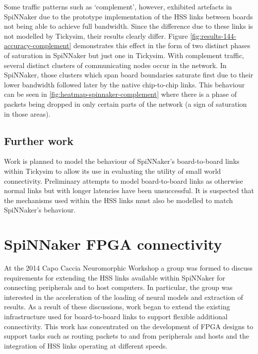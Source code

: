 			Some traffic patterns such as `complement', however, exhibited artefacts
			in SpiNNaker due to the prototype implementation of the HSS links between
			boards not being able to achieve full bandwidth. Since the difference due
			to these links is not modelled by Tickysim, their results clearly differ.
			Figure \ref{fig:results-144-accuracy-complement} demonstrates this effect
			in the form of two distinct phases of saturation in SpiNNaker but just one
			in Tickysim. With complement traffic, several distinct clusters of
			communicating nodes occur in the network. In SpiNNaker, those clusters
			which span board boundaries saturate first due to their lower bandwidth
			followed later by the native chip-to-chip links. This behaviour can be
			seen in \ref{fig:heatmap-spinnaker-complement} where there is a phase of
			packets being dropped in only certain parts of the network (a sign of
			saturation in those areas).
		
		\subsection{Further work}
			
			
			Work is planned to model the behaviour of SpiNNaker's board-to-board links
			within Tickysim to allow its use in evaluating the utility of small world
			connectivity. Preliminary attempts to model board-to-board links as
			otherwise normal links but with longer latencies have been unsuccessful.
			It is suspected that the mechanisms used within the HSS links must also be
			modelled to match SpiNNaker's behaviour.
	
	
	\section{SpiNNaker FPGA connectivity}
		
		
		At the 2014 Capo Caccia Neuromorphic Workshop a group was formed to discuss
		requirements for extending the HSS links available within SpiNNaker for
		connecting peripherals and to host computers. In particular, the group was
		interested in the acceleration of the loading of neural models and
		extraction of results.  As a result of these discussions, work began to
		extend the existing infrastructure used for board-to-board links to support
		flexible additional connectivity. This work has concentrated on the
		development of FPGA designs to support tasks such as routing packets to and
		from peripherals and hosts and the integration of HSS links operating at
		different speeds.
		
